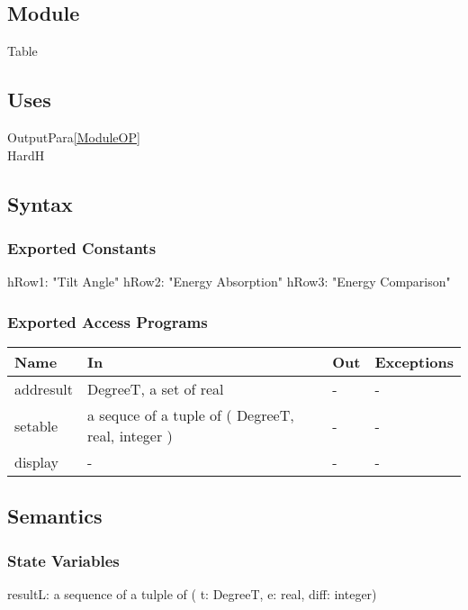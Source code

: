 \documentclass[12pt, titlepage]{article}
\begin{document}
\subsection{Module}
Table\\

\subsection{Uses}
OutputPara\ref{ModuleOP}\\
HardH\\


\subsection{Syntax}

\subsubsection{Exported Constants}

hRow1: "Tilt Angle"
hRow2: "Energy Absorption"
hRow3: "Energy Comparison"

\subsubsection{Exported Access Programs}

\begin{center}
\begin{tabular}{p{2cm} p{5cm} p{5cm} p{2cm}}
\hline
\textbf{Name} & \textbf{In} & \textbf{Out} & \textbf{Exceptions} \\
\hline 
addresult &  DegreeT, a set of real & - & - \\
setable & a sequce of a tuple of ( DegreeT, real, integer ) & - & - \\
display & - & - & - \\

\hline
\end{tabular}
\end{center}


\subsection{Semantics}

\subsubsection{State Variables}

resultL: a sequence of a tulple of ( t: DegreeT, e: real, diff: integer)\\
\end{document}
